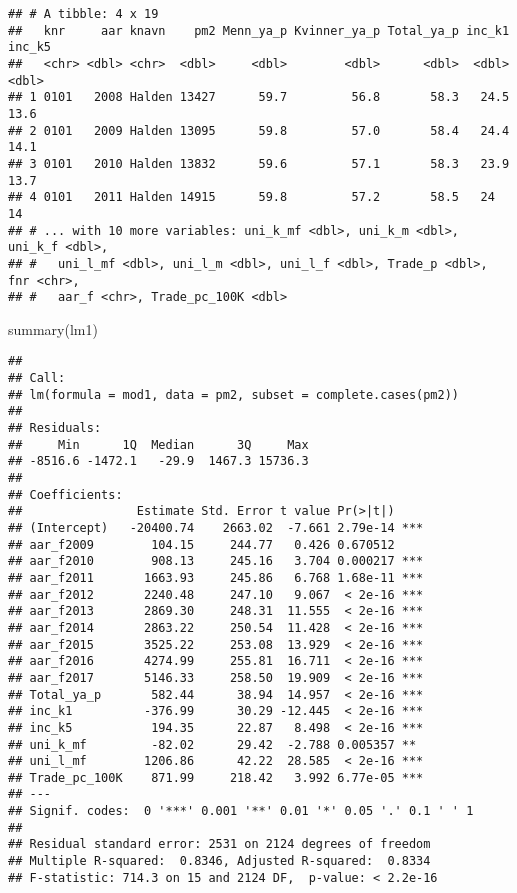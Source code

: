 \documentclass[
]{article}
\newenvironment{Shaded}{\begin{snugshade}}{\end{snugshade}}
\newcommand{\FunctionTok}[1]{\textcolor[rgb]{0.00,0.00,0.00}{#1}}
\newcommand{\NormalTok}[1]{#1}
\begin{document}
\begin{verbatim}
## # A tibble: 4 x 19
##   knr     aar knavn    pm2 Menn_ya_p Kvinner_ya_p Total_ya_p inc_k1 inc_k5
##   <chr> <dbl> <chr>  <dbl>     <dbl>        <dbl>      <dbl>  <dbl>  <dbl>
## 1 0101   2008 Halden 13427      59.7         56.8       58.3   24.5   13.6
## 2 0101   2009 Halden 13095      59.8         57.0       58.4   24.4   14.1
## 3 0101   2010 Halden 13832      59.6         57.1       58.3   23.9   13.7
## 4 0101   2011 Halden 14915      59.8         57.2       58.5   24     14  
## # ... with 10 more variables: uni_k_mf <dbl>, uni_k_m <dbl>, uni_k_f <dbl>,
## #   uni_l_mf <dbl>, uni_l_m <dbl>, uni_l_f <dbl>, Trade_p <dbl>, fnr <chr>,
## #   aar_f <chr>, Trade_pc_100K <dbl>
\end{verbatim}

\begin{Shaded}
\begin{Highlighting}[]
\FunctionTok{summary}\NormalTok{(lm1)}
\end{Highlighting}
\end{Shaded}

\begin{verbatim}
## 
## Call:
## lm(formula = mod1, data = pm2, subset = complete.cases(pm2))
## 
## Residuals:
##     Min      1Q  Median      3Q     Max 
## -8516.6 -1472.1   -29.9  1467.3 15736.3 
## 
## Coefficients:
##                Estimate Std. Error t value Pr(>|t|)    
## (Intercept)   -20400.74    2663.02  -7.661 2.79e-14 ***
## aar_f2009        104.15     244.77   0.426 0.670512    
## aar_f2010        908.13     245.16   3.704 0.000217 ***
## aar_f2011       1663.93     245.86   6.768 1.68e-11 ***
## aar_f2012       2240.48     247.10   9.067  < 2e-16 ***
## aar_f2013       2869.30     248.31  11.555  < 2e-16 ***
## aar_f2014       2863.22     250.54  11.428  < 2e-16 ***
## aar_f2015       3525.22     253.08  13.929  < 2e-16 ***
## aar_f2016       4274.99     255.81  16.711  < 2e-16 ***
## aar_f2017       5146.33     258.50  19.909  < 2e-16 ***
## Total_ya_p       582.44      38.94  14.957  < 2e-16 ***
## inc_k1          -376.99      30.29 -12.445  < 2e-16 ***
## inc_k5           194.35      22.87   8.498  < 2e-16 ***
## uni_k_mf         -82.02      29.42  -2.788 0.005357 ** 
## uni_l_mf        1206.86      42.22  28.585  < 2e-16 ***
## Trade_pc_100K    871.99     218.42   3.992 6.77e-05 ***
## ---
## Signif. codes:  0 '***' 0.001 '**' 0.01 '*' 0.05 '.' 0.1 ' ' 1
## 
## Residual standard error: 2531 on 2124 degrees of freedom
## Multiple R-squared:  0.8346, Adjusted R-squared:  0.8334 
## F-statistic: 714.3 on 15 and 2124 DF,  p-value: < 2.2e-16
\end{verbatim}
\end{document}
